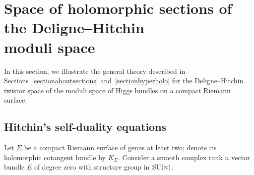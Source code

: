 \documentclass[pdftex]{sigma}
\numberwithin{equation}{section}
\theoremstyle{definition}
\begin{document}
\section[Space of holomorphic sections of the Deligne--Hitchin moduli
space]{Space of holomorphic sections of the Deligne--Hitchin\\ moduli
space} \label{s:DeligneHitchin}

In this section, we illustrate the general theory described in Sections~\ref{sectionaboutsections} and~\ref{sectionhyperholo} for the
Deligne--Hitchin twistor space of the moduli space of Higgs bundles on a compact Riemann
surface.

\subsection{Hitchin's self-duality equations}\label{ss: MSD}

Let $\Sigma$ be a compact Riemann surface of genus at least two; denote its holomorphic
cotangent bundle by $K_\Sigma$. Consider
a smooth complex rank $n$ vector bundle $E$ of degree zero with structure group in ${\rm SU}(n)$.
\end{document}
